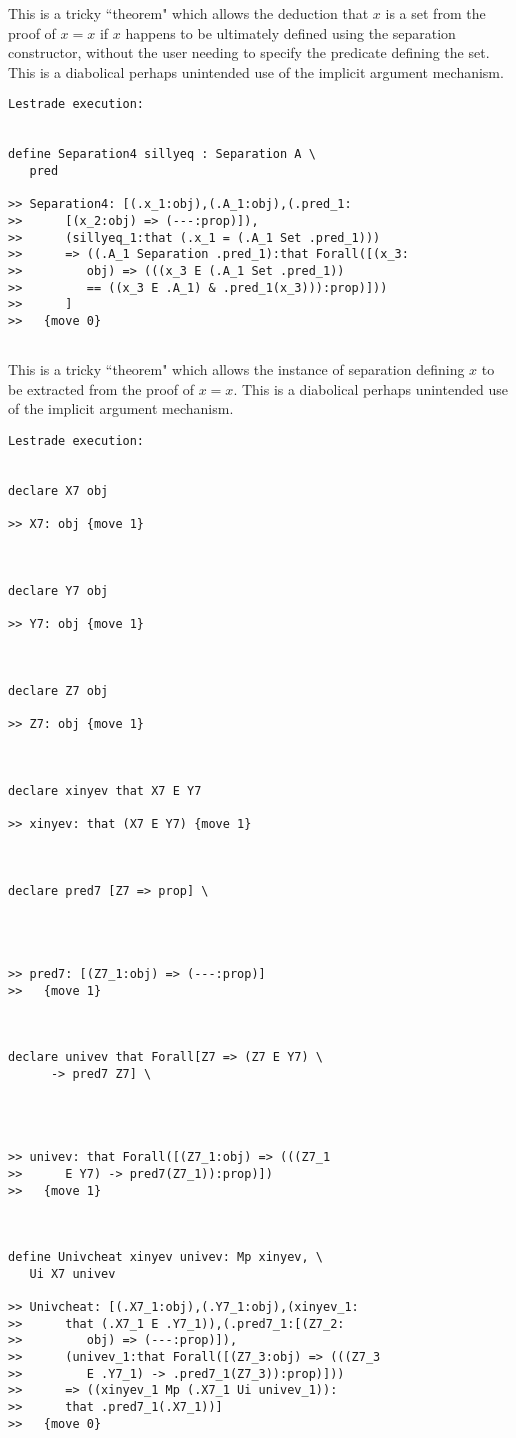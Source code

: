 \documentclass[12pt]{article}
\begin{document}
This is a tricky ``theorem" which allows the deduction that $x$ is a set from the proof of $x=x$ if $x$ happens to be ultimately defined using the separation constructor, without the user needing to specify the predicate defining the set.  This is a diabolical perhaps unintended use of the implicit argument mechanism.

\begin{verbatim}Lestrade execution:


define Separation4 sillyeq : Separation A \
   pred

>> Separation4: [(.x_1:obj),(.A_1:obj),(.pred_1:
>>      [(x_2:obj) => (---:prop)]),
>>      (sillyeq_1:that (.x_1 = (.A_1 Set .pred_1)))
>>      => ((.A_1 Separation .pred_1):that Forall([(x_3:
>>         obj) => (((x_3 E (.A_1 Set .pred_1))
>>         == ((x_3 E .A_1) & .pred_1(x_3))):prop)]))
>>      ]
>>   {move 0}


\end{verbatim}

This is a tricky ``theorem" which allows the instance of separation defining $x$ to be extracted from the proof of $x=x$.  This is a diabolical perhaps unintended use of the implicit argument mechanism.

\begin{verbatim}Lestrade execution:


declare X7 obj

>> X7: obj {move 1}



declare Y7 obj

>> Y7: obj {move 1}



declare Z7 obj

>> Z7: obj {move 1}



declare xinyev that X7 E Y7

>> xinyev: that (X7 E Y7) {move 1}



declare pred7 [Z7 => prop] \
   



>> pred7: [(Z7_1:obj) => (---:prop)]
>>   {move 1}



declare univev that Forall[Z7 => (Z7 E Y7) \
      -> pred7 Z7] \
   



>> univev: that Forall([(Z7_1:obj) => (((Z7_1
>>      E Y7) -> pred7(Z7_1)):prop)])
>>   {move 1}



define Univcheat xinyev univev: Mp xinyev, \
   Ui X7 univev

>> Univcheat: [(.X7_1:obj),(.Y7_1:obj),(xinyev_1:
>>      that (.X7_1 E .Y7_1)),(.pred7_1:[(Z7_2:
>>         obj) => (---:prop)]),
>>      (univev_1:that Forall([(Z7_3:obj) => (((Z7_3
>>         E .Y7_1) -> .pred7_1(Z7_3)):prop)]))
>>      => ((xinyev_1 Mp (.X7_1 Ui univev_1)):
>>      that .pred7_1(.X7_1))]
>>   {move 0}


\end{verbatim}
\end{document}
